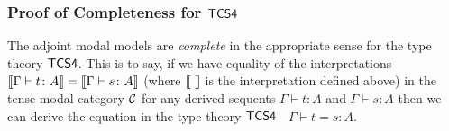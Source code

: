 \subsubsection{Proof of Completeness for $\sf{TCS4}$}
\label{subsec:proof_of_completeness_for_tcs4}

\begin{theorem*}
\label{thm:tcs4-completeness}
The adjoint modal models are \textit{complete} in the appropriate
sense for the type theory $\sf{TCS4}$. This is to say, if we have
equality of the interpretations $\sem{\Gamma \vdash t \colon A} =
\sem{\Gamma \vdash s \colon A}$ (where \mbox{$\sem{\ } $} is the
interpretation defined above) in the tense modal category $\cal C$ for
any derived sequents $\Gamma \vdash t \colon A$ and $\Gamma \vdash s
\colon A$ then we can derive the equation in the type theory
$\sf{TCS4}$ $\;$ $\Gamma \vdash t = s \colon A$.
\end{theorem*}

